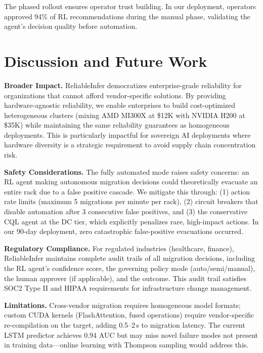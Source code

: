 \documentclass[conference,10pt,letterpaper]{IEEEtran}
\begin{document}
The phased rollout ensures operator trust building. In our deployment, operators approved 94\% of RL recommendations during the manual phase, validating the agent's decision quality before automation.

\section{Discussion and Future Work}
\label{sec:discussion}


\textbf{Broader Impact.} ReliableInfer democratizes enterprise-grade reliability for organizations that cannot afford vendor-specific solutions. By providing hardware-agnostic reliability, we enable enterprises to build cost-optimized heterogeneous clusters (mixing AMD MI300X at \$12K with NVIDIA H200 at \$35K) while maintaining the same reliability guarantees as homogeneous deployments. This is particularly impactful for sovereign AI deployments where hardware diversity is a strategic requirement to avoid supply chain concentration risk.

\textbf{Safety Considerations.} The fully automated mode raises safety concerns: an RL agent making autonomous migration decisions could theoretically evacuate an entire rack due to a false positive cascade. We mitigate this through: (1) action rate limits (maximum 5 migrations per minute per rack), (2) circuit breakers that disable automation after 3 consecutive false positives, and (3) the conservative CQL agent at the DC tier, which explicitly penalizes rare, high-impact actions. In our 90-day deployment, zero catastrophic false-positive evacuations occurred.

\textbf{Regulatory Compliance.} For regulated industries (healthcare, finance), ReliableInfer maintains complete audit trails of all migration decisions, including the RL agent's confidence score, the governing policy mode (auto/semi/manual), the human approver (if applicable), and the outcome. This audit trail satisfies SOC2 Type II and HIPAA requirements for infrastructure change management.

\textbf{Limitations.} Cross-vendor migration requires homogeneous model formats; custom CUDA kernels (FlashAttention, fused operations) require vendor-specific re-compilation on the target, adding 0.5--2\,s to migration latency. The current LSTM predictor achieves 0.94 AUC but may miss novel failure modes not present in training data---online learning with Thompson sampling would address this.
\end{document}
